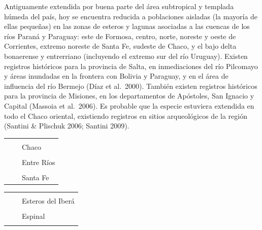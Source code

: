 \documentclass[
  x11names]{article}
\begin{document}
Antiguamente extendida por buena parte del área subtropical y templada
húmeda del país, hoy se encuentra reducida a poblaciones aisladas (la
mayoría de ellas pequeñas) en las zonas de esteros y lagunas asociadas a
las cuencas de los ríos Paraná y Paraguay: este de Formosa, centro,
norte, noreste y oeste de Corrientes, extremo noreste de Santa Fe,
sudeste de Chaco, y el bajo delta bonaerense y entrerriano (incluyendo
el extremo sur del río Uruguay). Existen registros históricos para la
provincia de Salta, en inmediaciones del río Pilcomayo y áreas inundadas
en la frontera con Bolivia y Paraguay, y en el área de influencia del
río Bermejo (Díaz et al.~2000). También existen registros históricos
para la provincia de Misiones, en los departamentos de Apóstoles, San
Ignacio y Capital (Massoia et al.~2006). Es probable que la especie
estuviera extendida en todo el Chaco oriental, existiendo registros en
sitios arqueológicos de la región (Santini \& Plischuk 2006; Santini
2009).

\begin{tabu} to 
\toprule
\textbf{} &  & \\
\textbf{} &  & Chaco\\
\textbf{} &  & \\
\textbf{} &  & Entre Ríos\\
\textbf{} &  & \\
\textbf{} &  & Santa Fe\\
\bottomrule
\end{tabu}

\begin{tabu} to 
\toprule
\textbf{} &  & \\
\textbf{} &  & Esteros del Iberá\\
\textbf{} &  & \\
\textbf{} &  & Espinal\\
\textbf{} &  & \\
\bottomrule
\end{tabu}
\end{document}
